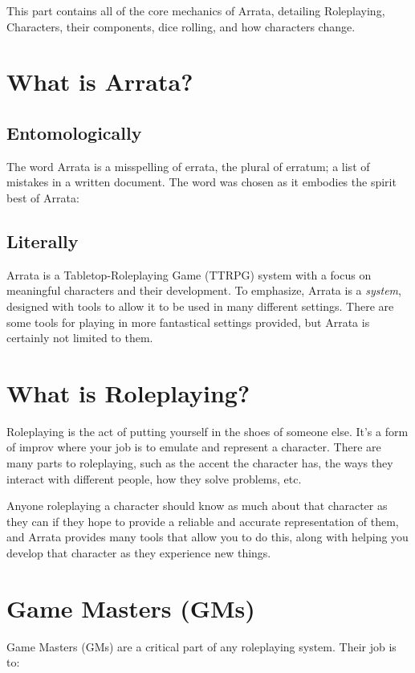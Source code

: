 \documentclass[../main.tex]{subfiles}
\begin{document}
    This part contains all of the core mechanics of Arrata, detailing Roleplaying, Characters, their components, dice rolling, and how characters change.

    \section{What is Arrata?}

    \subsection{Entomologically}
    The word Arrata is a misspelling of errata, the plural of erratum; a list of mistakes in a written document. The word was chosen as it embodies the spirit best of Arrata: \textbf{}
    
    \subsection{Literally}
    Arrata is a Tabletop-Roleplaying Game (TTRPG) system with a focus on meaningful characters and their development. To emphasize, Arrata is a {\em system}, designed with tools to allow it to be used in many different settings. There are some tools for playing in more fantastical settings provided, but Arrata is certainly not limited to them.
    

    \section{What is Roleplaying?}

    Roleplaying is the act of putting yourself in the shoes of someone else. It's a form of improv where your job is to emulate and represent a character. There are many parts to roleplaying, such as the accent the character has, the ways they interact with different people, how they solve problems, etc.
    
    Anyone roleplaying a character should know as much about that character as they can if they hope to provide a reliable and accurate representation of them, and Arrata provides many tools that allow you to do this, along with helping you develop that character as they experience new things.

    \section{Game Masters (GMs)}

    Game Masters (GMs) are a critical part of any roleplaying system. Their job is to:
\end{document}
